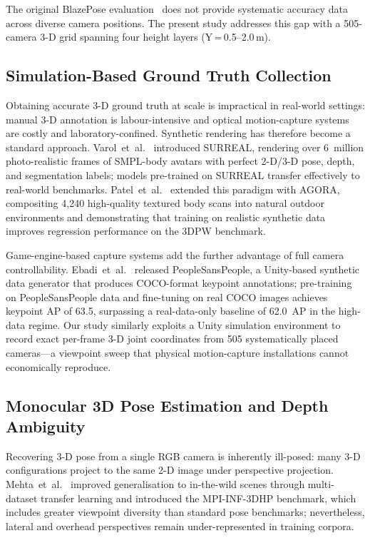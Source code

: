 \documentclass[twocolumn]{article}
\begin{document}
The original BlazePose evaluation~\cite{blazepose} does not provide
systematic accuracy data across diverse camera positions.
The present study addresses this gap with a
505-camera 3-D grid spanning four height layers (Y\,=\,0.5--2.0\,m).

\subsection{Simulation-Based Ground Truth Collection}

Obtaining accurate 3-D ground truth at scale is impractical in real-world
settings: manual 3-D annotation is labour-intensive and optical
motion-capture systems are costly and laboratory-confined. Synthetic
rendering has therefore become a standard approach. Varol~et~al.~\cite{surreal}
introduced SURREAL, rendering over 6~million photo-realistic frames of
SMPL-body avatars with perfect 2-D/3-D pose, depth, and segmentation labels;
models pre-trained on SURREAL transfer effectively to real-world benchmarks.
Patel~et~al.~\cite{agora} extended this
paradigm with AGORA, compositing 4,240 high-quality textured body scans into
natural outdoor environments and demonstrating that training on realistic
synthetic data improves regression performance on the 3DPW benchmark.

Game-engine-based capture systems add the further advantage of full camera
controllability. Ebadi~et~al.~\cite{peoplesanspeople} released
PeopleSansPeople, a Unity-based synthetic data generator that produces
COCO-format keypoint annotations; pre-training on PeopleSansPeople data and
fine-tuning on real COCO images achieves keypoint AP of 63.5, surpassing a
real-data-only baseline of 62.0~AP in the high-data regime. Our study
similarly exploits a Unity simulation environment to record exact per-frame
3-D joint coordinates from 505 systematically placed cameras---a viewpoint
sweep that physical motion-capture installations cannot economically
reproduce.

\subsection{Monocular 3D Pose Estimation and Depth Ambiguity}

Recovering 3-D pose from a single RGB camera is inherently ill-posed: many
3-D configurations project to the same 2-D image under perspective
projection. Mehta~et~al.~\cite{mehta2017} improved generalisation to
in-the-wild scenes through multi-dataset transfer learning and introduced the
MPI-INF-3DHP benchmark, which includes greater viewpoint diversity than
standard pose benchmarks; nevertheless, lateral and overhead perspectives
remain under-represented in training corpora.
\end{document}
